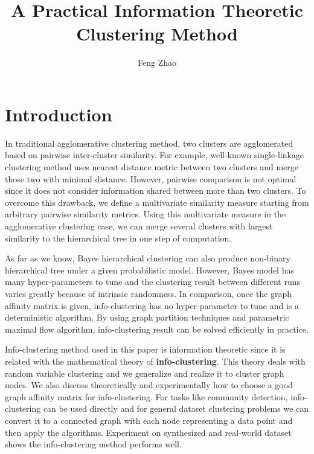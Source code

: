 \documentclass{article}
\title{A Practical Information Theoretic Clustering Method}
\author{
  Feng Zhao
}
\begin{document}

\maketitle

\begin{abstract}

\end{abstract}

\section{Introduction}
In traditional agglomerative clustering method, two clusters are agglomerated based on pairwise inter-cluster similarity.  For example, well-known single-linkage clustering method uses nearest distance metric between two clusters and merge those two with minimal distance\cite{RN16}.  However, pairwise comparison is not optimal since it does not consider information shared between more than two clusters.  To overcome this drawback, we define a multivariate similarity measure starting from arbitrary pairwise similarity metrics. Using this multivariate measure in the agglomerative clustering case, we can merge several clusters with largest similarity to the hierarchical tree in one step of computation.

As far as we know, Bayes hierarchical clustering\cite{Heller2005Bayesian} can also produce non-binary hierarchical tree under a given probabilistic model. However, Bayes model has many hyper-parameters to tune and the clustering result between different runs varies greatly because of intrinsic randomness. In comparison, once the graph affinity matrix is given, info-clustering has no hyper-parameter to tune and is a deterministic algorithm. By using graph partition techniques\cite{RN3} and parametric maximal flow algorithm\cite{RN4}, info-clustering result can be solved efficiently in practice. 

Info-clustering method used in this paper is information theoretic since it is related with the mathematical theory of \textbf{info-clustering}\cite{RN1}. This theory deals with random variable clustering and we generalize and realize it to cluster graph nodes. We also discuss theoretically and experimentally how to choose a good graph affinity matrix for info-clustering. For tasks like community detection, info-clustering can be used directly and for general dataset clustering problems we can convert it to a connected graph with each node representing a data point and then apply the algorithms. Experiment on synthesized and real-world dataset shows the info-clustering method performs well. 
\end{document}
